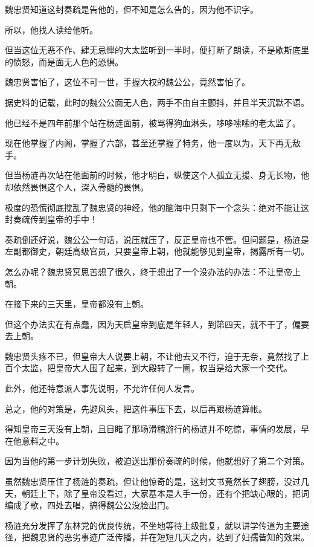 \begin{multicols}{\theparacolNo}
		魏忠贤知道这封奏疏是告他的，但不知是怎么告的，因为他不识字。

		所以，他找人读给他听。

		但当这位无恶不作、肆无忌惮的大太监听到一半时，便打断了朗读，不是歇斯底里的愤怒，而是面无人色的恐惧。

		魏忠贤害怕了，这位不可一世，手握大权的魏公公，竟然害怕了。

		据史料的记载，此时的魏公公面无人色，两手不由自主颤抖，并且半天沉默不语。

		他已经不是四年前那个站在杨涟面前，被骂得狗血淋头，哆哆嗦嗦的老太监了。

		现在他掌握了内阁，掌握了六部，甚至还掌握了特务，他一度以为，天下再无敌手。

		但当杨涟再次站在他面前的时候，他才明白，纵使这个人孤立无援、身无长物，他却依然畏惧这个人，深入骨髓的畏惧。

		极度的恐慌彻底搅乱了魏忠贤的神经，他的脑海中只剩下一个念头：绝对不能让这封奏疏传到皇帝的手中！

		奏疏倒还好说，魏公公一句话，说压就压了，反正皇帝也不管。但问题是，杨涟是左副都御史，朝廷高级官员，只要皇帝上朝，他就能够见到皇帝，揭露所有一切。

		怎么办呢？魏忠贤冥思苦想了很久，终于想出了一个没办法的办法：不让皇帝上朝。

		在接下来的三天里，皇帝都没有上朝。

		但这个办法实在有点蠢，因为天启皇帝到底是年轻人，到第四天，就不干了，偏要去上朝。

		魏忠贤头疼不已，但皇帝大人说要上朝，不让他去又不行，迫于无奈，竟然找了上百个太监，把皇帝大人围了起来，到大殿转了一圈，权当是给大家一个交代。

		此外，他还特意派人事先说明，不允许任何人发言。

		总之，他的对策是，先避风头，把这件事压下去，以后再跟杨涟算帐。

		得知皇帝三天没有上朝，且目睹了那场滑稽游行的杨涟并不吃惊，事情的发展，早在他意料之中。

		因为当他的第一步计划失败，被迫送出那份奏疏的时候，他就想好了第二个对策。

		虽然魏忠贤压住了杨涟的奏疏，但让他惊奇的是，这封文书竟然长了翅膀，没过几天，朝廷上下，除了皇帝没看过，大家基本是人手一份，还有个把缺心眼的，把词编成了歌，四处去唱，搞得魏公公没脸出门。

		杨涟充分发挥了东林党的优良传统，不坐地等待上级批复，就以讲学传道为主要途径，把魏忠贤的恶劣事迹广泛传播，并在短短几天之内，达到了妇孺皆知的效果。


\end{multicols}
